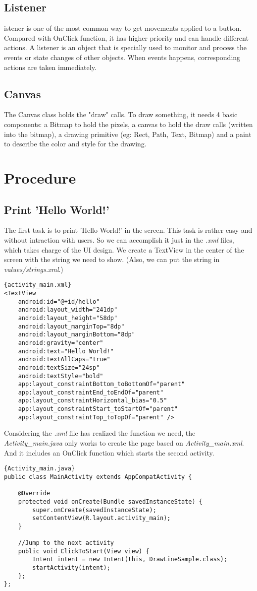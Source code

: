 \documentclass[12pt]{report}
\begin{document}
\subsection{Listener}
istener is one of the most common way to get movements applied to a button. Compared with OnClick function, it has higher priority and can handle different actions. A listener is an object that is specially used to monitor and process the events or state changes of other objects. When events happens, corresponding actions are taken immediately.
\subsection{Canvas}
The Canvas class holds the "draw" calls. To draw something, it needs 4 basic components: a Bitmap to hold the pixels, a canvas to hold the draw calls (written into the bitmap), a drawing primitive (eg: Rect, Path, Text, Bitmap) and a paint to describe the color and style for the drawing.
\section{Procedure}
\subsection{Print 'Hello World!'}
The first task is to print 'Hello World!' in the screen. This task is rather easy and without intraction with users. So we can accomplish it just in the \textit{.xml} files, which takes charge of the UI design. We create a TextView in the center of the screen with the string we need to show. (Also, we can put the string in \textit{values/strings.xml}.)

\begin{lstlisting}{activity_main.xml}
<TextView
	android:id="@+id/hello"
	android:layout_width="241dp"
	android:layout_height="58dp"
	android:layout_marginTop="8dp"
	android:layout_marginBottom="8dp"
	android:gravity="center"
	android:text="Hello World!"
	android:textAllCaps="true"
	android:textSize="24sp"
	android:textStyle="bold"
	app:layout_constraintBottom_toBottomOf="parent"
	app:layout_constraintEnd_toEndOf="parent"
	app:layout_constraintHorizontal_bias="0.5"
	app:layout_constraintStart_toStartOf="parent"
	app:layout_constraintTop_toTopOf="parent" />
\end{lstlisting}

Considering the \textit{.xml} file has realized the function we need, the \textit{Activity\_main.java} only works to create the page based on \textit{Activity\_main.xml}. And it includes an OnClick function which starts the second activity.
\begin{lstlisting}{Activity_main.java}
public class MainActivity extends AppCompatActivity {

	@Override
	protected void onCreate(Bundle savedInstanceState) {
		super.onCreate(savedInstanceState);
		setContentView(R.layout.activity_main);
	}
	
	//Jump to the next activity
	public void ClickToStart(View view) {
		Intent intent = new Intent(this, DrawLineSample.class);
		startActivity(intent);
	};
};
\end{lstlisting}
\end{document}
